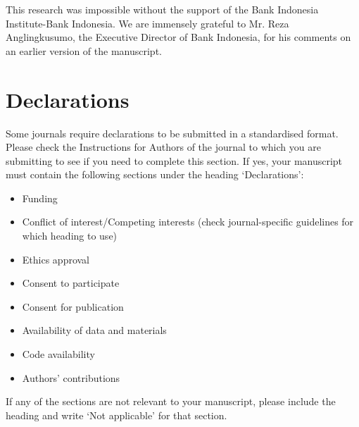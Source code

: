 \documentclass[sn-basic]{sn-jnl}%
\theoremstyle{thmstyleone}%
\theoremstyle{thmstyletwo}%
\theoremstyle{thmstylethree}%
\begin{document}
\backmatter






This research was impossible without the support of the Bank Indonesia Institute-Bank Indonesia. We are immensely grateful to Mr. Reza Anglingkusumo, the Executive Director of Bank Indonesia, for his comments on an earlier version of the manuscript.

\section*{Declarations}

Some journals require declarations to be submitted in a standardised format. Please check the Instructions for Authors of the journal to which you are submitting to see if you need to complete this section. If yes, your manuscript must contain the following sections under the heading `Declarations':

\begin{itemize}
\item Funding
\item Conflict of interest/Competing interests (check journal-specific guidelines for which heading to use)
\item Ethics approval 
\item Consent to participate
\item Consent for publication
\item Availability of data and materials
\item Code availability 
\item Authors' contributions
\end{itemize}

\noindent
If any of the sections are not relevant to your manuscript, please include the heading and write `Not applicable' for that section. 
\end{document}
